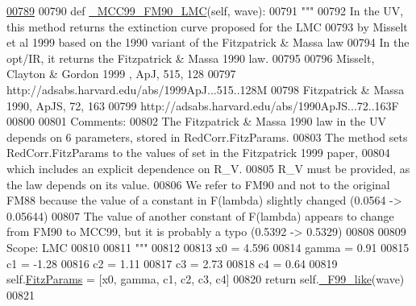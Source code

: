 \begin{DoxyVerb}
\begin{DoxyCode}
\hypertarget{classpyneb_1_1extinction_1_1red__corr_1_1_red_corr_l00789}{}\hyperlink{classpyneb_1_1extinction_1_1red__corr_1_1_red_corr_af97fbc015537102bbc163263b8582986}{00789} 
00790     \textcolor{keyword}{def }\hyperlink{classpyneb_1_1extinction_1_1red__corr_1_1_red_corr_af97fbc015537102bbc163263b8582986}{\_MCC99\_FM90\_LMC}(self, wave):
00791         \textcolor{stringliteral}{"""}
00792 \textcolor{stringliteral}{        In the UV, this method returns the extinction curve proposed for the LMC }
00793 \textcolor{stringliteral}{        by Misselt et al 1999 based on the 1990 variant of the Fitzpatrick & Massa law}
00794 \textcolor{stringliteral}{        In the opt/IR, it returns the Fitzpatrick & Massa 1990 law.}
00795 \textcolor{stringliteral}{}
00796 \textcolor{stringliteral}{        Misselt, Clayton & Gordon 1999 , ApJ, 515, 128 }
00797 \textcolor{stringliteral}{        http://adsabs.harvard.edu/abs/1999ApJ...515..128M}
00798 \textcolor{stringliteral}{        Fitzpatrick & Massa 1990, ApJS, 72, 163}
00799 \textcolor{stringliteral}{        http://adsabs.harvard.edu/abs/1990ApJS...72..163F}
00800 \textcolor{stringliteral}{        }
00801 \textcolor{stringliteral}{        Comments:}
00802 \textcolor{stringliteral}{        The Fitzpatrick & Massa 1990 law in the UV depends on 6 parameters, stored in RedCorr.FitzParams.}
00803 \textcolor{stringliteral}{        The method sets RedCorr.FitzParams to the values of set in the Fitzpatrick 1999 paper, }
00804 \textcolor{stringliteral}{        which includes an explicit dependence on R\_V.}
00805 \textcolor{stringliteral}{        R\_V must be provided, as the law depends on its value.}
00806 \textcolor{stringliteral}{        We refer to FM90 and not to the original FM88 because the value of a constant in F(lambda) slightly
       changed (0.0564 -> 0.05644)}
00807 \textcolor{stringliteral}{        The value of another constant of F(lambda) appears to change from FM90 to MCC99, but it is probably
       a typo (0.5392 -> 0.5329) }
00808 \textcolor{stringliteral}{        }
00809 \textcolor{stringliteral}{        Scope: LMC}
00810 \textcolor{stringliteral}{}
00811 \textcolor{stringliteral}{        """}
00812     
00813         x0 = 4.596  
00814         gamma = 0.91
00815         c1 = -1.28
00816         c2 = 1.11    
00817         c3 = 2.73    
00818         c4 = 0.64    
00819         self.\hyperlink{classpyneb_1_1extinction_1_1red__corr_1_1_red_corr_a133fcc7513d358e629266b24cbe7bebc}{FitzParams} = [x0, gamma, c1, c2, c3, c4]
00820         \textcolor{keywordflow}{return} self.\hyperlink{classpyneb_1_1extinction_1_1red__corr_1_1_red_corr_a8eb0fe7f840c32a87adfcf7ddd98a095}{\_F99\_like}(wave)
00821 


\end{DoxyCode}
\end{DoxyVerb}

